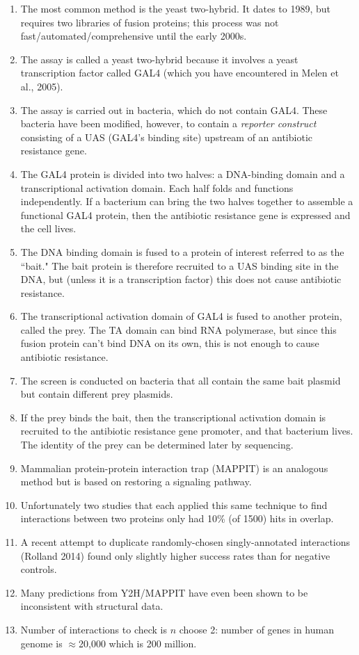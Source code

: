 \documentclass{article}
\begin{document}
\begin{enumerate}
\begin{enumerate}
\item The most common method is the yeast two-hybrid. It dates to 1989, but requires two libraries of fusion proteins; this process was not fast/automated/comprehensive until the early 2000s.
\item The assay is called a yeast two-hybrid because it involves a yeast transcription factor called GAL4 (which you have encountered in Melen et al., 2005).
\item The assay is carried out in bacteria, which do not contain GAL4. These bacteria have been modified, however, to contain a \textit{reporter construct} consisting of a UAS (GAL4's binding site) upstream of an antibiotic resistance gene.
\item The GAL4 protein is divided into two halves: a DNA-binding domain and a transcriptional activation domain. Each half folds and functions independently. If a bacterium can bring the two halves together to assemble a functional GAL4 protein, then the antibiotic resistance gene is expressed and the cell lives.
\item The DNA binding domain is fused to a protein of interest referred to as the ``bait."  The bait protein is therefore recruited to a UAS binding site in the DNA, but (unless it is a transcription factor) this does not cause antibiotic resistance.
\item The transcriptional activation domain of GAL4 is fused to another protein, called the prey. The TA domain can bind RNA polymerase, but since this fusion protein can't bind DNA on its own, this is not enough to cause antibiotic resistance.
\item The screen is conducted on bacteria that all contain the same bait plasmid but contain different prey plasmids.
\item If the prey binds the bait, then the transcriptional activation domain is recruited to the antibiotic resistance gene promoter, and that bacterium lives. The identity of the prey can be determined later by sequencing.
\item Mammalian protein-protein interaction trap (MAPPIT) is an analogous method but is based on restoring a signaling pathway.
\item Unfortunately two studies that each applied this same technique to find interactions between two proteins only had 10\% (of 1500) hits in overlap.
\item A recent attempt to duplicate randomly-chosen singly-annotated interactions (Rolland 2014) found only slightly higher success rates than for negative controls.
\item Many predictions from Y2H/MAPPIT have even been shown to be inconsistent with structural data.
\item Number of interactions to check is $n$ choose 2: number of genes in human genome is $\approx$20,000 which is 200 million.

\end{enumerate}
\end{enumerate}
\end{document}
